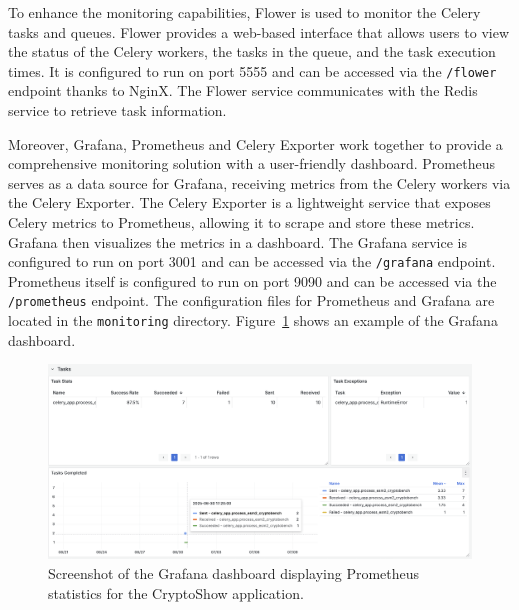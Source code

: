 To enhance the monitoring capabilities, Flower is used to monitor the Celery tasks and queues. Flower provides a web-based interface that allows users to view the status of the Celery workers, the tasks in the queue, and the task execution times. It is configured to run on port 5555 and can be accessed via the \lstinline|/flower| endpoint thanks to NginX. The Flower service communicates with the Redis service to retrieve task information.

Moreover, Grafana, Prometheus and Celery Exporter work together to provide a comprehensive monitoring solution with a user-friendly dashboard. Prometheus serves as a data source for Grafana, receiving metrics from the Celery workers via the Celery Exporter. The Celery Exporter is a lightweight service that exposes Celery metrics to Prometheus, allowing it to scrape and store these metrics. Grafana then visualizes the metrics in a dashboard. The Grafana service is configured to run on port 3001 and can be accessed via the \lstinline|/grafana| endpoint. Prometheus itself is configured to run on port 9090 and can be accessed via the \lstinline|/prometheus| endpoint. The configuration files for Prometheus and Grafana are located in the \lstinline|monitoring| directory. Figure~\ref{fig:grafana} shows an example of the Grafana dashboard.

\begin{figure}[htpb]
    \centering
    \includegraphics[width=\textwidth]{img/grafana.png}
    \caption{Screenshot of the Grafana dashboard displaying Prometheus statistics for the CryptoShow application.}
    \label{fig:grafana}
\end{figure}

